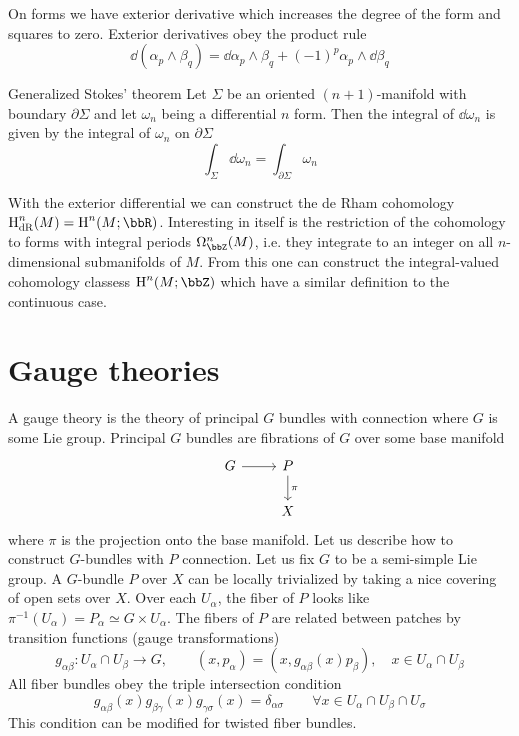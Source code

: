 On forms we have exterior derivative which increases the degree of the form and squares to zero. Exterior derivatives obey the product rule 
\begin{equation}
    \dd{(\alpha_p\wedge \beta_q)}=\dd{\alpha}_p\wedge \beta_q+(-1)^p\alpha_p\wedge \dd{\beta}_q
\end{equation}
\begin{thm}{Generalized Stokes' theorem}{}
    Let $\Sigma$ be an oriented $(n+1)$-manifold with boundary $\partial \Sigma$ and let $\omega_n$ being a differential $n$ form. Then the integral of $\dd{\omega}_n$ is given by the integral of $\omega_n$ on $\partial \Sigma$ 
    \begin{equation}
        \int_\Sigma \dd{\omega}_n=\int_{\partial \Sigma}\omega_n
    \end{equation}
\end{thm}
With the exterior differential we can construct the de Rham cohomology $\HH_\rm{dR}^n(M)=\HH^n(M;\bbR)$. Interesting in itself is the restriction of the cohomology to forms with integral periods $\Omega_\bbZ^n(M)$, i.e. they integrate to an integer on all $n$-dimensional submanifolds of $M$. From this one can construct the integral-valued cohomology classess $\HH^n(M;\bbZ)$ which have a similar definition to the continuous case. 

\section{Gauge theories}
A gauge theory is the theory of principal $G$ bundles with connection where $G$ is some Lie group. Principal $G$ bundles are fibrations of $G$ over some base manifold 
\begin{equation}
\begin{tikzcd}
    G \arrow{r} & P \arrow{d}{\pi} \\
    & X 
\end{tikzcd}
\end{equation}
where $\pi$ is the projection onto the base manifold. Let us describe how to construct $G$-bundles with $P$ connection. Let us fix $G$ to be a semi-simple Lie group. A $G$-bundle $P$ over $X$ can be locally trivialized by taking a nice covering of open sets over $X$. Over each $U_\alpha$, the fiber of $P$ looks like $\pi^{-1}(U_\alpha)=P_\alpha\simeq G\times U_\alpha$. The fibers of $P$ are related between patches by transition functions (gauge transformations)
\begin{equation}
    g_{\alpha \beta}:U_\alpha\cap U_\beta\rightarrow G,\qquad (x,p_\alpha)=(x,g_{\alpha \beta}(x)p_\beta),\quad x\in U_\alpha\cap U_\beta
\end{equation}
All fiber bundles obey the triple intersection condition 
\begin{equation}
    g_{\alpha \beta }(x)g_{\beta \gamma }(x)g_{\gamma \sigma}(x)=\delta_{\alpha \sigma}\qquad \forall x\in U_\alpha\cap U_\beta \cap U_\sigma
\end{equation}
This condition can be modified for twisted fiber bundles.

